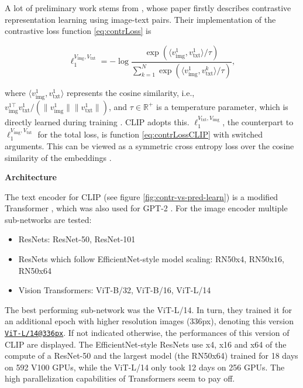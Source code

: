 \documentclass[
]{krantz}
\providecommand{\tightlist}{%
  \setlength{\itemsep}{0pt}\setlength{\parskip}{0pt}}
\begin{document}
A lot of preliminary work stems from \citet{zhang2020contrastive}, whose paper firstly describes contrastive representation learning using image-text pairs.
Their implementation of the contrastive loss function \eqref{eq:contrLoss} is

\begin{equation}
  \ell_1^{V_\text{img}, V_\text{txt}} = - \log \frac{\exp(\langle v_\text{img}^1, v_\text{txt}^1 \rangle / \tau)}{\sum_{k=1}^{N} \exp(\langle v_\text{img}^1, v_\text{txt}^k \rangle / \tau)},
  \label{eq:contrLossCLIP}
\end{equation}

where \(\langle v_\text{img}^1, v_\text{txt}^1 \rangle\) represents the cosine similarity, i.e., \(v_\text{img}^{1 \top} v_\text{txt}^1 / (\|v_\text{img}^1\| \|v_\text{txt}^1\|)\), and \(\tau \in \mathbb{R}^+\) is a temperature parameter, which is directly learned during training \citep{zhang2020contrastive}.
CLIP adopts this.
\(\ell_1^{V_\text{txt}, V_\text{img}}\), the counterpart to \(\ell_1^{V_\text{img}, V_\text{txt}}\) for the total loss, is function \eqref{eq:contrLossCLIP} with switched arguments.
This can be viewed as a symmetric cross entropy loss over the cosine similarity of the embeddings \citep{radford2021learning}.

\textbf{Architecture}

The text encoder for CLIP (see figure \ref{fig:contr-vs-pred-learn}) is a modified Transformer \citep{vaswani2017attention}, which was also used for GPT-2 \citep{radford2019language}.
For the image encoder multiple sub-networks are tested:

\begin{itemize}
\tightlist
\item
  ResNets: ResNet-50, ResNet-101
\item
  ResNets which follow EfficientNet-style model scaling: RN50x4, RN50x16, RN50x64
\item
  Vision Transformers: ViT-B/32, ViT-B/16, ViT-L/14
\end{itemize}

The best performing sub-network was the ViT-L/14.
In turn, they trained it for an additional epoch with higher resolution images (336px), denoting this version \href{mailto:ViT-L/14@336px}{\nolinkurl{ViT-L/14@336px}}.
If not indicated otherwise, the performances of this version of CLIP are displayed.
The EfficientNet-style ResNets use x4, x16 and x64 of the compute of a ResNet-50 and the largest model (the RN50x64) trained for 18 days on 592 V100 GPUs, while the ViT-L/14 only took 12 days on 256 GPUs.
The high parallelization capabilities of Transformers seem to pay off.
\end{document}
